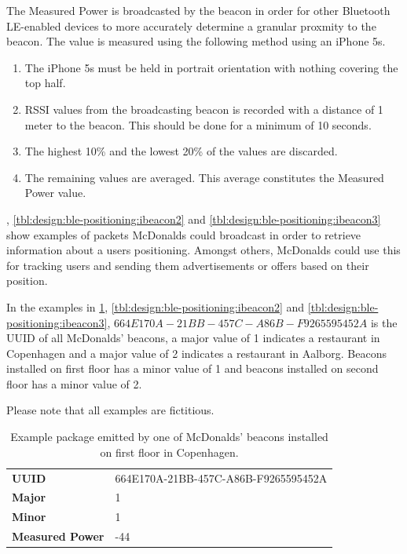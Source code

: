The Measured Power is broadcasted by the beacon in order for other Bluetooth LE-enabled devices to more accurately determine a granular proxmity to the beacon. The value is measured using the following method \cite{apple:proximity-beacon-spec} using an iPhone 5s.

\begin{enumerate}
\item The iPhone 5s must be held in portrait orientation with nothing covering the top half.
\item RSSI values from the broadcasting beacon is recorded with a distance of 1 meter to the beacon. This should be done for a minimum of 10 seconds.
\item The highest 10\% and the lowest 20\% of the values are discarded.
\item The remaining values are averaged. This average constitutes the Measured Power value.
\end{enumerate}

, \cref{tbl:design:ble-positioning:ibeacon2} and \cref{tbl:design:ble-positioning:ibeacon3} show examples of packets McDonalds could broadcast in order to retrieve information about a users positioning. Amongst others, McDonalds could use this for tracking users and sending them advertisements or offers based on their position.

In the examples in \cref{tbl:design:ble-positioning:ibeacon1}, \cref{tbl:design:ble-positioning:ibeacon2} and \cref{tbl:design:ble-positioning:ibeacon3}, $664E170A-21BB-457C-A86B-F9265595452A$ is the UUID of all McDonalds' beacons, a major value of 1 indicates a restaurant in Copenhagen and a major value of 2 indicates a restaurant in Aalborg. Beacons installed on first floor has a minor value of 1 and beacons installed on second floor has a minor value of 2.

Please note that all examples are fictitious.

\begin{table}[h!]
\centering
\caption{Example package emitted by one of McDonalds' beacons installed on first floor in Copenhagen.}
\label{tbl:design:ble-positioning:ibeacon1}
\begin{tabular}{ll}
\textbf{UUID}  & 664E170A-21BB-457C-A86B-F9265595452A \\
\textbf{Major} & 1                                    \\
\textbf{Minor} & 1            \\                        
\textbf{Measured Power} & -44
\end{tabular}
\end{table}

